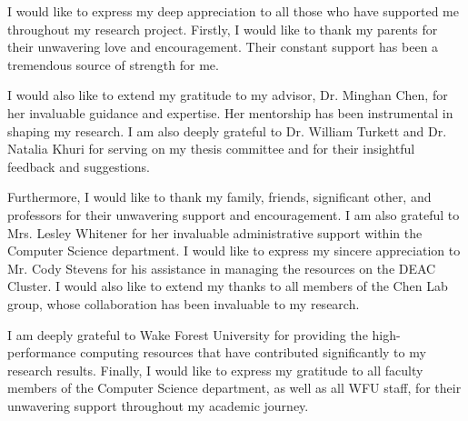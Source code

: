 I would like to express my deep appreciation to all those who have supported me throughout my research project. Firstly, I would like to thank my parents for their unwavering love and encouragement. Their constant support has been a tremendous source of strength for me.

I would also like to extend my gratitude to my advisor, Dr. Minghan Chen, for her invaluable guidance and expertise. Her mentorship has been instrumental in shaping my research. I am also deeply grateful to Dr. William Turkett and Dr. Natalia Khuri for serving on my thesis committee and for their insightful feedback and suggestions.

Furthermore, I would like to thank my family, friends, significant other, and professors for their unwavering support and encouragement. I am also grateful to Mrs. Lesley Whitener for her invaluable administrative support within the Computer Science department. I would like to express my sincere appreciation to Mr. Cody Stevens for his assistance in managing the resources on the DEAC Cluster. I would also like to extend my thanks to all members of the Chen Lab group, whose collaboration has been invaluable to my research.

I am deeply grateful to Wake Forest University for providing the high-performance computing resources that have contributed significantly to my research results. Finally, I would like to express my gratitude to all faculty members of the Computer Science department, as well as all WFU staff, for their unwavering support throughout my academic journey.